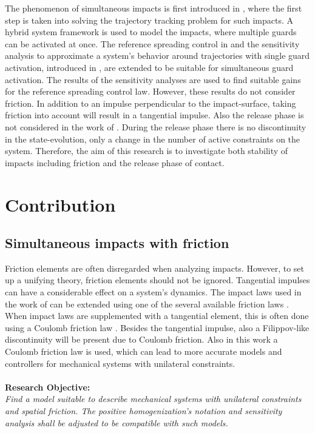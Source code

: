 \documentclass[../DC2017114Bouma.tex]{subfiles}
\begin{document}
The phenomenon of simultaneous impacts is first introduced in \cite{Chen2018a}, where the first step is taken into solving the trajectory tracking problem for such impacts. A hybrid system framework is used to model the impacts, where multiple guards can be activated at once. The reference spreading control in \cite{Rijnen2016,Rijnen2017} and the sensitivity analysis to approximate a system's behavior around trajectories with single guard activation, introduced in \cite{Saccon2014}, are extended to be suitable for simultaneous guard activation. The results of the sensitivity analyses are used to find suitable gains for the reference spreading control law. However, these results do not consider friction. In addition to an impulse perpendicular to the impact-surface, taking friction into account will result in a tangential impulse. Also the release phase is not considered in the work of \cite{Chen2018a}. During the release phase there is no discontinuity in the state-evolution, only a change in the number of active constraints on the system. Therefore, the aim of this research is to investigate both stability of impacts including friction and the release phase of contact.

\section{Contribution}

\subsection*{Simultaneous impacts with friction}
Friction elements are often disregarded when analyzing impacts. However, to set up a unifying theory, friction elements should not be ignored. Tangential impulses can have a considerable effect on a system's dynamics. The impact laws used in the work of \cite{Chen2018a} can be extended using one of the several available friction laws \cite{Leine2008}. When impact laws are supplemented with a tangential element, this is often done using a Coulomb friction law \cite{Glocker2014a}. Besides the tangential impulse, also a Filippov-like discontinuity will be present due to Coulomb friction. Also in this work a Coulomb friction law is used, which can lead to more accurate models and controllers for mechanical systems with unilateral constraints.\\\\
\textbf{Research Objective:}\\
\textit{Find a model suitable to describe mechanical systems with unilateral constraints and spatial friction. The positive homogenization's notation and sensitivity analysis shall be adjusted to be compatible with such models.}
\end{document}
